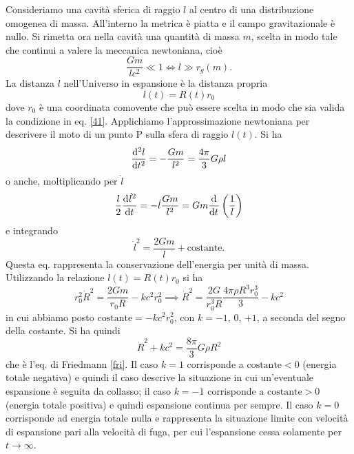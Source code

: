 Consideriamo una cavità sferica di raggio $l$ al centro di una distribuzione
omogenea di massa.  All'interno la metrica è piatta e il campo gravitazionale è
nullo.  Si rimetta ora nella cavità una quantità di massa $m$, scelta in modo
tale che continui a valere la meccanica newtoniana, cioè
\begin{equation}
  \frac{Gm}{l c^2} \ll 1 \iff l \gg r_g(m).
  \label{41}
\end{equation}
La distanza $l$ nell'Universo in espansione è la distanza propria
\begin{equation}
  l(t) = R(t) r_0
\end{equation}
dove $r_0$ è una coordinata comovente che può essere scelta in modo che sia
valida la condizione in eq. \eqref{41}.  Applichiamo l'approssimazione
newtoniana per descrivere il moto di un punto P sulla sfera di raggio $l(t)$.
Si ha
\begin{equation}
  \toder[2]{l}{t} = -\frac{G m}{l^2} = \frac{4 \pi}{3} G \rho l
  \label{1103}
\end{equation}
o anche, moltiplicando per $\dot l$
\begin{equation}
  \frac{l}{2} \frac{{\mathop{}\!\mathrm{d}^{}}\dot{l}^2}{\mathop{}\!\mathrm{d} {t}^{}} = - \dot{l} \frac{G m}{l^2} = Gm  \frac{{\mathop{}\!\mathrm{d}^{}}}{\mathop{}\!\mathrm{d} {t}^{}}
  \left( \frac{1}{l} \right)
\end{equation}
e integrando
\begin{equation}
  \dot{l}^2 = \frac{2G m}{l} + \text{costante}.
  \label{219}
\end{equation}
Questa eq. rappresenta la conservazione dell'energia per unità di massa.
Utilizzando la relazione $l(t)=R(t) r_0$ si ha
\begin{equation}
  r_0^2 \dot{R}^2 = \frac{2Gm}{r_0 R} - k c^2 r_0^2
  \implies \dot{R}^2 = \frac{2G}{r_0^3 R} \frac{4 \pi \rho R^3 r_0^3}{3} - k c^2
\end{equation}
in cui abbiamo posto $\text{costante} = - k c^2 r_0^2$, con $k=-1$, $0$, $+1$, a
seconda del segno della costante.  Si ha quindi
\begin{equation}
  \dot{R}^2 + k c^2 = \frac{8 \pi}{3} G \rho R^2
  \label{1106}
\end{equation}
che è l'eq. di Friedmann \eqref{fri}.  Il caso $k=1$ corrisponde a
$\text{costante}<0$ (energia totale negativa) e quindi il caso descrive la
situazione in cui un'eventuale espansione è seguita da collasso; il caso $k=-1$
corrisponde a $\text{costante}>0$ (energia totale positiva) e quindi espansione
continua per sempre.  Il caso $k=0$ corrisponde ad energia totale nulla e
rappresenta la situazione limite con velocità di espansione pari alla velocità
di fuga, per cui l'espansione cessa solamente per $t\to \infty$.

